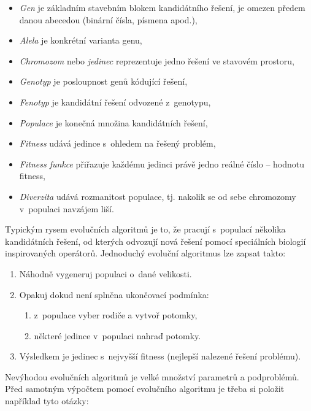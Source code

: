 \begin{itemize}
    \item\emph{Gen} je základním stavebním blokem kandidátního řešení, je omezen předem danou abecedou (binární čísla, písmena apod.),
    \item\emph{Alela} je konkrétní varianta genu,
    \item\emph{Chromozom} nebo \emph{jedinec} reprezentuje jedno řešení ve stavovém prostoru,
    \item\emph{Genotyp} je posloupnost genů kódující řešení,
    \item\emph{Fenotyp} je kandidátní řešení odvozené z~genotypu,
    \item\emph{Populace} je konečná množina kandidátních řešení,
    \item\emph{Fitness} udává  jedince s~ohledem na řešený problém,
    \item\emph{Fitness funkce} přiřazuje každému jedinci právě jedno reálné číslo -- hodnotu fitness,
    \item\emph{Diverzita} udává rozmanitost populace, tj. nakolik se od sebe chromozomy v~populaci navzájem liší.
\end{itemize}

Typickým rysem evolučních algoritmů je to, že pracují s~populací několika kandidátních řešení, od kterých odvozují nová řešení pomocí speciálních biologií inspirovaných operátorů. Jednoduchý evoluční algoritmus lze zapsat takto:

\begin{enumerate}
    \item Náhodně vygeneruj populaci o~dané velikosti.
    \item Opakuj dokud není splněna ukončovací podmínka:
    \begin{enumerate}
        \item z~populace vyber rodiče a vytvoř potomky,
        \item některé jedince v~populaci nahraď potomky.
    \end{enumerate}
    \item Výsledkem je jedinec s~nejvyšší fitness (nejlepší nalezené řešení problému).
\end{enumerate}

Nevýhodou evolučních algoritmů je velké množství parametrů a podproblémů. Před samotným výpočtem pomocí evolučního algoritmu je třeba si položit například tyto otázky:

